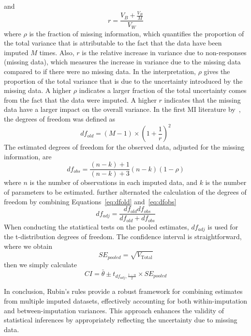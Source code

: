 and 
\begin{equation}
    r=\frac{V_B+\frac{V_B}{M}}{V_W}
\end{equation}
where $\rho$ is the fraction of missing information, which quantifies the proportion of the total variance that is attributable to the fact that the data have been imputed $M$ times. 
Also, $r$ is the relative increase in variance due to non-responses (missing data), which measures the increase in variance due to the missing data compared to if there were no missing data. 
In the interpretation, $\rho$ gives the proportion of the total variance that is due to the uncertainty introduced by the missing data. 
A higher $\rho$ indicates a larger fraction of the total uncertainty comes from the fact that the data were imputed.
A higher $r$ indicates that the missing data have a larger impact on the overall variance. 
In the first MI literature by~\citet{rubin1987multiple}, the degrees of freedom was defined as
\begin{equation}\label{eq:dfold}
    df_{old}=(M-1)\times (1+\frac{1}{r})^2
\end{equation}
The estimated degrees of freedom for the observed data, adjusted for the missing information, are
\begin{equation}\label{eq:dfobs}
    df_{obs}=\frac{(n-k)+1}{(n-k)+3}(n-k)(1-\rho)
\end{equation}
where $n$ is the number of observations in each imputed data, and $k$ is the number of parameters to be estimated.
\citet{barnard1999miscellanea} further alternated the calculation of the degrees of freedom by combining Equations~\ref{eq:dfold} and~\ref{eq:dfobs}
\begin{equation}
    df_{adj}=\frac{df_{old}df_{obs}}{df_{old}+df_{obs}}
\end{equation}
When conducting the statistical tests on the pooled estimates, $df_{adj}$ is used for the t-distribution degrees of freedom. 
The confidence interval is straightforward, where we obtain 
\begin{equation}
    SE_{pooled}=\sqrt{V_{\text{Total}}}
\end{equation}
then we simply calculate 
\begin{equation}
    CI=\bar{\theta}\pm t_{df_{adj},\frac{1-\alpha}{2}}\times SE_{pooled}
\end{equation}

In conclusion, Rubin's rules provide a robust framework for combining estimates from multiple imputed datasets, effectively accounting for both within-imputation and between-imputation variances. 
This approach enhances the validity of statistical inferences by appropriately reflecting the uncertainty due to missing data.